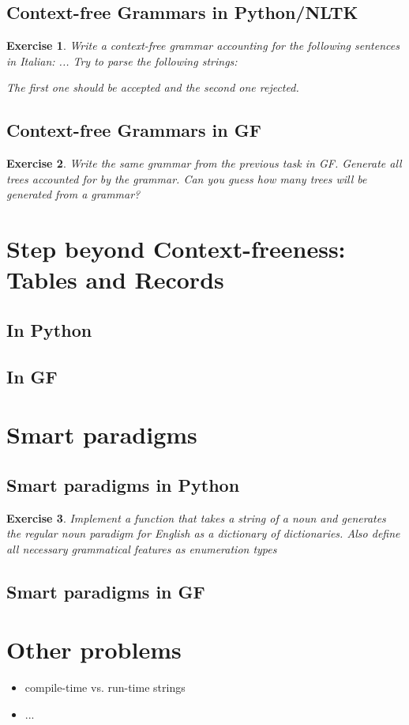 \documentclass{scrartcl}
\newtheorem{exercise}{Exercise}
\begin{document}
\subsection{Context-free Grammars in Python/NLTK}



\begin{exercise}
  Write a context-free grammar accounting for the following sentences in Italian:
  ...
  Try to parse the following strings:

  The first one should be accepted and the second one rejected.
\end{exercise}
\subsection{Context-free Grammars in GF}



\begin{exercise}
  Write the same grammar from the previous task in GF. Generate all trees accounted for by the grammar. Can you guess how many trees will be
  generated from a grammar?
\end{exercise}
\section{Step beyond Context-freeness: Tables and Records}
\subsection{In Python}
\subsection{In GF}
\section{Smart paradigms}
\subsection{Smart paradigms in Python}
\begin{exercise}
  Implement a function that takes a string of a noun and generates the regular noun paradigm for English as a dictionary of dictionaries. Also define all necessary grammatical features as enumeration types
\end{exercise}
\subsection{Smart paradigms in GF}
\section{Other problems}
\begin{itemize}
\item compile-time vs. run-time strings
\item ...
\end{itemize}
\end{document}
